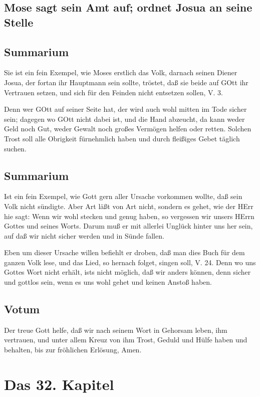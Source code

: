 \section{Mose sagt sein Amt auf; ordnet Josua an seine Stelle}

\section{Summarium}

Sie ist ein fein Exempel, wie Moses erstlich das Volk, darnach seinen Diener Josua, der fortan ihr Hauptmann sein sollte, tröstet, daß sie beide auf GOtt ihr Vertrauen setzen, und sich für den Feinden nicht entsetzen sollen, V. 3.

Denn wer GOtt auf seiner Seite hat, der wird auch wohl mitten im Tode sicher sein; dagegen wo GOtt nicht dabei ist, und die Hand abzeucht, da kann weder Geld noch Gut, weder Gewalt noch großes Vermögen helfen oder retten. Solchen Trost soll alle Obrigkeit fürnehmlich haben und durch fleißiges Gebet täglich suchen.

\section{Summarium}

Ist ein fein Exempel, wie Gott gern aller Ursache vorkommen wollte, daß sein Volk nicht sündigte. Aber Art läßt von Art nicht, sondern es gehet, wie der HErr hie sagt: Wenn wir wohl stecken und genug haben, so vergessen wir unsers HErrn Gottes und seines Worts. Darum muß er mit allerlei Unglück hinter uns her sein, auf daß wir nicht sicher werden und in Sünde fallen.

Eben um dieser Ursache willen befiehlt er droben, daß man dies Buch für dem ganzen Volk lese, und das Lied, so hernach folget, singen soll, V. 24. Denn wo uns Gottes Wort nicht erhält, ists nicht möglich, daß wir anders können, denn sicher und gottlos sein, wenn es uns wohl gehet und keinen Anstoß haben.

\section{Votum}

Der treue Gott helfe, daß wir nach seinem Wort in Gehorsam leben, ihm vertrauen, und unter allem Kreuz von ihm Trost, Geduld und Hülfe haben und behalten, bis zur fröhlichen Erlösung, Amen.

\chapter{Das 32. Kapitel}

